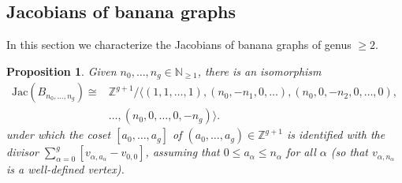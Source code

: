 \documentclass[11pt]{article}
\newtheorem{prop}[theo]{Proposition}
\theoremstyle{definition}
\numberwithin{equation}{section}
\newcommand{\N}{\mathbb{N}}
\newcommand{\Z}{\mathbb{Z}}
\newcommand{\jac}[1]{\mathrm{Jac}\left({#1}\right)}
\newcommand{\gen}[1]{\langle #1 \rangle}
\begin{document}
\subsection{Jacobians of banana graphs}
In this section we characterize the Jacobians of banana graphs of genus $\geq 2$.

\begin{prop}\label{prop-JacBanana}
    Given $n_0,\dots,n_{g} \in \N_{\geq 1}$, there is an isomorphism
    \begin{align*}
        \jac{B_{n_0,\dots,n_g}}\cong &\Z^{g+1}/\gen{(1,1,\dots,1),(n_0,-n_1,0,\dots),(n_0,0,-n_2,0,\dots,0),\\&\dots,(n_0,0,\dots,0,-n_{g})}.
    \end{align*}
    under which the coset $[a_0, \ldots , a_g]$ of $(a_0, \ldots, a_g) \in \Z^{g+1}$ is identified with the divisor $\sum_{\alpha=0}^g [ v_{\alpha,a_\alpha} - v_{0,0} ]$, assuming that $0 \leq a_\alpha \leq n_\alpha$ for all $\alpha$ (so that $v_{\alpha,n_\alpha}$ is a well-defined vertex).
\end{prop}
\end{document}
